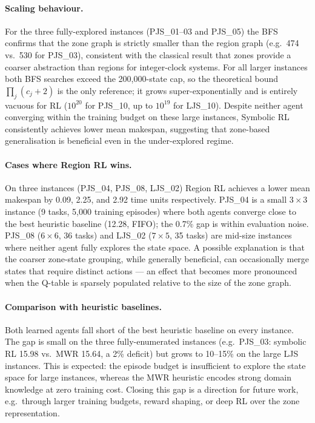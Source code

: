 \paragraph{Scaling behaviour.}
For the three fully-explored instances (PJS\_01--03 and PJS\_05) the BFS
confirms that the zone graph is strictly smaller than the region graph (e.g.\
474 vs.\ 530 for PJS\_03), consistent with the classical result that zones
provide a coarser abstraction than regions for integer-clock systems.  For all
larger instances both BFS searches exceed the 200{,}000-state cap, so the
theoretical bound $\prod_j(c_j{+}2)$ is the only reference; it grows
super-exponentially and is entirely vacuous for RL ($10^{20}$ for PJS\_10,
up to $10^{19}$ for LJS\_10).  Despite neither agent converging within the
training budget on these large instances, Symbolic RL consistently achieves
lower mean makespan, suggesting that zone-based generalisation is beneficial
even in the under-explored regime.

\paragraph{Cases where Region RL wins.}
On three instances (PJS\_04, PJS\_08, LJS\_02) Region RL achieves a lower mean
makespan by 0.09, 2.25, and 2.92 time units respectively.  PJS\_04 is a small
$3{\times}3$ instance (9 tasks, 5{,}000 training episodes) where both agents
converge close to the best heuristic baseline (12.28, FIFO); the 0.7\% gap is
within evaluation noise.  PJS\_08 ($6{\times}6$, 36 tasks) and LJS\_02
($7{\times}5$, 35 tasks) are mid-size instances where neither agent fully
explores the state space.  A possible explanation is that the coarser
zone-state grouping, while generally beneficial, can occasionally merge states
that require distinct actions --- an effect that becomes more pronounced when
the Q-table is sparsely populated relative to the size of the zone graph.

\paragraph{Comparison with heuristic baselines.}
Both learned agents fall short of the best heuristic baseline on every
instance.  The gap is small on the three fully-enumerated instances (e.g.\
PJS\_03: symbolic RL 15.98 vs.\ MWR 15.64, a 2\% deficit) but grows to
10--15\% on the large LJS instances.  This is expected: the episode budget is
insufficient to explore the state space for large instances, whereas the MWR
heuristic encodes strong domain knowledge at zero training cost.  Closing this
gap is a direction for future work, e.g.\ through larger training budgets,
reward shaping, or deep RL over the zone representation.

